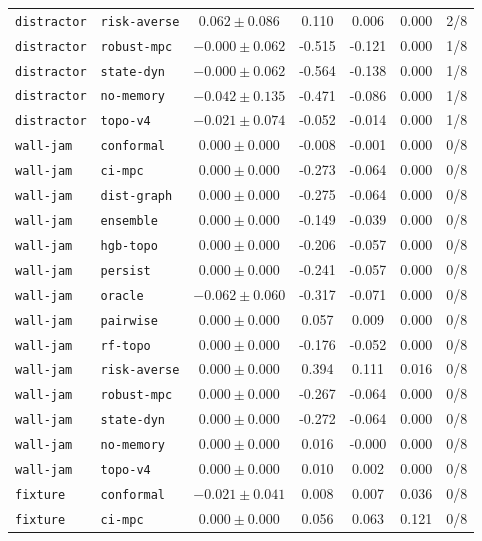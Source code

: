 \documentclass{article}
\begin{document}
\begin{center}
\begin{tabular}{llccccc}
\texttt{distractor} & \texttt{risk-averse} & $0.062 \pm 0.086$ & 0.110 & 0.006 & 0.000 & 2/8 \\
\texttt{distractor} & \texttt{robust-mpc} & $-0.000 \pm 0.062$ & -0.515 & -0.121 & 0.000 & 1/8 \\
\texttt{distractor} & \texttt{state-dyn} & $-0.000 \pm 0.062$ & -0.564 & -0.138 & 0.000 & 1/8 \\
\texttt{distractor} & \texttt{no-memory} & $-0.042 \pm 0.135$ & -0.471 & -0.086 & 0.000 & 1/8 \\
\texttt{distractor} & \texttt{topo-v4} & $-0.021 \pm 0.074$ & -0.052 & -0.014 & 0.000 & 1/8 \\
\texttt{wall-jam} & \texttt{conformal} & $0.000 \pm 0.000$ & -0.008 & -0.001 & 0.000 & 0/8 \\
\texttt{wall-jam} & \texttt{ci-mpc} & $0.000 \pm 0.000$ & -0.273 & -0.064 & 0.000 & 0/8 \\
\texttt{wall-jam} & \texttt{dist-graph} & $0.000 \pm 0.000$ & -0.275 & -0.064 & 0.000 & 0/8 \\
\texttt{wall-jam} & \texttt{ensemble} & $0.000 \pm 0.000$ & -0.149 & -0.039 & 0.000 & 0/8 \\
\texttt{wall-jam} & \texttt{hgb-topo} & $0.000 \pm 0.000$ & -0.206 & -0.057 & 0.000 & 0/8 \\
\texttt{wall-jam} & \texttt{persist} & $0.000 \pm 0.000$ & -0.241 & -0.057 & 0.000 & 0/8 \\
\texttt{wall-jam} & \texttt{oracle} & $-0.062 \pm 0.060$ & -0.317 & -0.071 & 0.000 & 0/8 \\
\texttt{wall-jam} & \texttt{pairwise} & $0.000 \pm 0.000$ & 0.057 & 0.009 & 0.000 & 0/8 \\
\texttt{wall-jam} & \texttt{rf-topo} & $0.000 \pm 0.000$ & -0.176 & -0.052 & 0.000 & 0/8 \\
\texttt{wall-jam} & \texttt{risk-averse} & $0.000 \pm 0.000$ & 0.394 & 0.111 & 0.016 & 0/8 \\
\texttt{wall-jam} & \texttt{robust-mpc} & $0.000 \pm 0.000$ & -0.267 & -0.064 & 0.000 & 0/8 \\
\texttt{wall-jam} & \texttt{state-dyn} & $0.000 \pm 0.000$ & -0.272 & -0.064 & 0.000 & 0/8 \\
\texttt{wall-jam} & \texttt{no-memory} & $0.000 \pm 0.000$ & 0.016 & -0.000 & 0.000 & 0/8 \\
\texttt{wall-jam} & \texttt{topo-v4} & $0.000 \pm 0.000$ & 0.010 & 0.002 & 0.000 & 0/8 \\
\texttt{fixture} & \texttt{conformal} & $-0.021 \pm 0.041$ & 0.008 & 0.007 & 0.036 & 0/8 \\
\texttt{fixture} & \texttt{ci-mpc} & $0.000 \pm 0.000$ & 0.056 & 0.063 & 0.121 & 0/8 \\
\bottomrule
\end{tabular}
\end{center}
\end{document}
